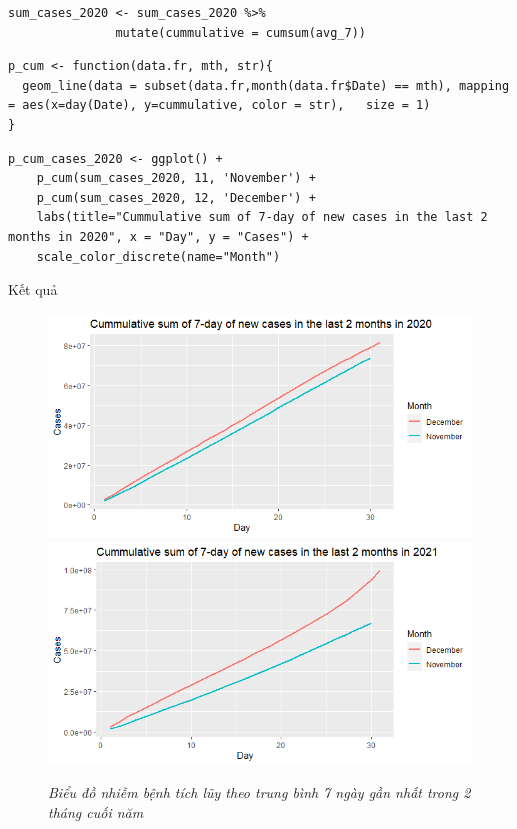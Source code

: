 \documentclass[a4paper]{article}
\theoremstyle{definition}
\begin{document}
\begin{enumerate}[1)]
    \begin{lstlisting}
sum_cases_2020 <- sum_cases_2020 %>% 
               mutate(cummulative = cumsum(avg_7))
    \end{lstlisting}
    
    \begin{lstlisting}
p_cum <- function(data.fr, mth, str){
  geom_line(data = subset(data.fr,month(data.fr$Date) == mth), mapping = aes(x=day(Date), y=cummulative, color = str),   size = 1)
}
    \end{lstlisting}    

    \begin{lstlisting}
p_cum_cases_2020 <- ggplot() + 
    p_cum(sum_cases_2020, 11, 'November') + 
    p_cum(sum_cases_2020, 12, 'December') + 
    labs(title="Cummulative sum of 7-day of new cases in the last 2 months in 2020", x = "Day", y = "Cases") + 
    scale_color_discrete(name="Month")
    \end{lstlisting}
    
    Kết quả

    \begin{figure}[H]
    \begin{center}
        \includegraphics[scale = .5]{viii/cum 2020cases.png}
        \includegraphics[scale = .5]{viii/cum 2021cases.png}
    \end{center}
        \vspace{+3mm}\caption{\it Biểu đồ nhiễm bệnh tích lũy theo trung bình 7 ngày gần nhất trong 2 tháng cuối năm}
    \end{figure}
    

\end{enumerate}
\end{document}
